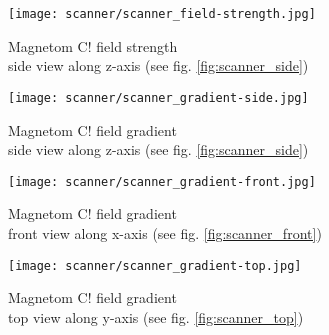\begin{figure}[!htb]
  	\centering
      \texttt{[image: scanner/scanner\_field-strength.jpg]}
      \caption{Magnetom C! field strength\\ side view along z-axis (see fig. \ref{fig:scanner_side}) \cite{magnetom_handbook}}
    \label{fig:strength_side}
\end{figure}

\begin{figure}[!htb]
    	\centering
        \texttt{[image: scanner/scanner\_gradient-side.jpg]}
        \caption{Magnetom C! field gradient\\ side view along z-axis (see fig. \ref{fig:scanner_side}) \cite{magnetom_handbook}}
        \label{fig:gradient_side}
\end{figure}

\begin{figure}[!htb]
  	\centering
    \texttt{[image: scanner/scanner\_gradient-front.jpg]}
    \caption{Magnetom C! field gradient\\ front view along x-axis (see fig. \ref{fig:scanner_front}) \cite{magnetom_handbook}}
    \label{fig:gradient_front}
    \end{figure}

\begin{figure}[!htb]
  	\centering
    \texttt{[image: scanner/scanner\_gradient-top.jpg]}
    \caption{Magnetom C! field gradient\\ top view along y-axis (see fig. \ref{fig:scanner_top}) \cite{magnetom_handbook}}
    \label{fig:gradient_top}
\end{figure}


